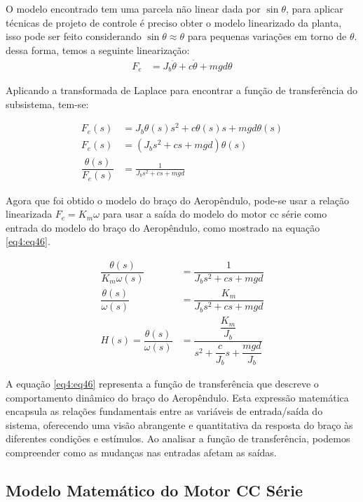 O modelo encontrado tem uma parcela não linear dada por $\sin{\theta}$, para aplicar técnicas de projeto de controle é preciso obter o modelo linearizado da planta, isso pode ser feito considerando $\sin{\theta} \approx \theta$ para pequenas variações em torno de $\theta$. dessa forma, temos a seguinte linearização:
\begin{align}
    F_e &= J_b\ddot{\theta} + c\dot{\theta} +mgd\theta
    \label{eq4:eq39}
\end{align}

Aplicando a transformada de Laplace para encontrar a função de transferência do subsistema, tem-se:

\begin{align}
    F_e(s) &= J_b\theta(s)s^2 + c\theta(s)s + mgd\theta(s) \label{eq4:eq41}\\
    F_e(s) &= (J_bs^2 + cs +mgd)\theta(s) \label{eq4:eq42}\\
    \dfrac{\theta(s)}{F_e(s)} &= \frac{1}{J_bs^2 + cs + mgd} \label{eq4:eq43}
\end{align}


Agora que foi obtido o modelo do braço do Aeropêndulo, pode-se usar a relação linearizada $F_e = K_m\omega$ para usar a saída do modelo do motor cc série como entrada do modelo do braço do Aeropêndulo, como mostrado na equação \ref{eq4:eq46}.

\begin{align}
    \dfrac{\theta(s)}{K_m\omega(s)} &= \dfrac{1}{J_bs^2 + cs +mgd} \label{eq4:eq44}\\
    \dfrac{\theta(s)}{\omega(s)} &= \dfrac{K_m}{J_bs^2 + cs +mgd} \label{eq4:eq45}\\
    H(s) = \dfrac{\theta(s)}{\omega(s)} &= \dfrac{\dfrac{K_m}{J_b}}{s^2 + \dfrac{c}{J_b}s +\dfrac{mgd}{J_b}} \label{eq4:eq46}
\end{align}


A equação \ref{eq4:eq46} representa a função de transferência que descreve o comportamento dinâmico do braço do Aeropêndulo. Esta expressão matemática encapsula as relações fundamentais entre as variáveis de entrada/saída do sistema, oferecendo uma visão abrangente e quantitativa da resposta do braço às diferentes condições e estímulos. Ao analisar a função de transferência, podemos compreender como as mudanças nas entradas afetam as saídas.


\subsection{Modelo Matemático do Motor CC Série}
\label{modelagem_motorccserie}

